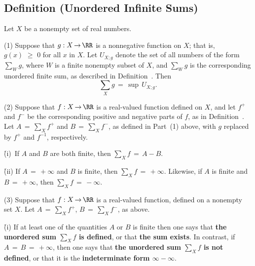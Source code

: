 \V
\V

            \subsection{\small{\bf Definition} (Unordered Infinite Sums)}
            \label{DefG20.20}

\V

        Let $X$ be a nonempty set of real numbers.

\V

        (1) Suppose that $g:X \,{\rightarrow}\, {\RR}$ is a nonnegative function on $X$;
    that is, $g(x)\,\,{\geq}\,\,0$ for all $x$ in $X$.
    Let $U_{X;g}$ denote the set of all numbers of the form ${\sum}_{W} g$, where $W$ is a finite nonempty subset of $X$, and ${\sum}_{W} g$ is the corresponding unordered finite sum, as described in Definition~.
    Then
        \begin{displaymath}
        {\sum}_{X} g \,=\, {\sup}\,U_{X;g}.
        \end{displaymath}

\V

        (2) Suppose that $f:X \,{\rightarrow}\, {\RR}$ is a real-valued function defined on $X$,
    and let $f^{+}$ and $f^{-}$ be the corresponding positive and negative parts of $f$, as in Definition~.
    Let $A \,=\, {\sum}_{X} f^{+}$ and $B \,=\, {\sum}_{X} f^{-}$, as defined in Part~(1) above, with $g$ replaced by $f^{+}$ and $f^{-1}$, respectively.

        \h (i)\, If $A$ and $B$ are both finite, then ${\sum}_{X} f \,=\, A-B$.

        \h (ii) If $A \,=\, +{\infty}$ and $B$ is finite, then ${\sum}_{X} f \,=\, +{\infty}$.
    Likewise, if $A$ is finite and $B \,=\, +{\infty}$, then ${\sum}_{X} f \,=\, -{\infty}$.

\V

        (3) Suppose that $f:X \,{\rightarrow}\, {\RR}$ is a real-valued function, defined on a nonempty set $X$.
    Let $A \,=\, {\sum}_{X} f^{+}$, $B \,=\, {\sum}_{X} f^{-}$, as above.

        \h (i) If at least one of the quantities $A$ or $B$ is finite then one says that {\bf the unordered sum ${\sum}_{X} f$ is defined}, or that {\bf the sum exists}.
    In contrast, if $A \,=\, B \,=\, +{\infty}$, then one says that {\bf the unordered sum ${\sum}_{X} f$ is not defined}, or that it is the {\bf indeterminate form ${\infty}-{\infty}$}.

